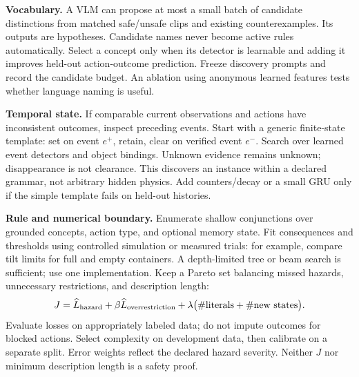 \documentclass[10pt]{article}
\begin{document}
\textbf{Vocabulary.} A VLM can propose at most a small batch of candidate distinctions from matched safe/unsafe clips and existing counterexamples. Its outputs are hypotheses. Candidate names never become active rules automatically. Select a concept only when its detector is learnable and adding it improves held-out action-outcome prediction. Freeze discovery prompts and record the candidate budget. An ablation using anonymous learned features tests whether language naming is useful.

\textbf{Temporal state.} If comparable current observations and actions have inconsistent outcomes, inspect preceding events. Start with a generic finite-state template: set on event $e^+$, retain, clear on verified event $e^-$. Search over learned event detectors and object bindings. Unknown evidence remains unknown; disappearance is not clearance. This discovers an instance within a declared grammar, not arbitrary hidden physics. Add counters/decay or a small GRU only if the simple template fails on held-out histories.

\textbf{Rule and numerical boundary.} Enumerate shallow conjunctions over grounded concepts, action type, and optional memory state. Fit consequences and thresholds using controlled simulation or measured trials: for example, compare tilt limits for full and empty containers. A depth-limited tree or beam search is sufficient; use one implementation. Keep a Pareto set balancing missed hazards, unnecessary restrictions, and description length:
\[
J=\widehat L_{\rm hazard}+\beta\widehat L_{\rm overrestriction}
  +\lambda\bigl(\#\text{literals}+\#\text{new states}\bigr).
\]
Evaluate losses on appropriately labeled data; do not impute outcomes for blocked actions. Select complexity on development data, then calibrate on a separate split. Error weights reflect the declared hazard severity. Neither $J$ nor minimum description length is a safety proof.
\end{document}
